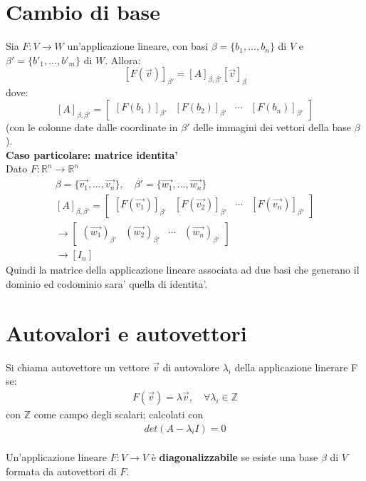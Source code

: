 \documentclass[10pt]{extarticle}
\begin{document}
\section{Cambio di base}
Sia \( F: V \to W \) un'applicazione lineare, con basi \( \beta = \{b_1, \dots, b_n\} \) di \( V \) e \( \beta' = \{b'_1, \dots, b'_m\} \) di \( W \). Allora:
\[
[F(\vec{v})]_{\beta'} = [A]_{\beta, \beta'} [\vec{v}]_{\beta}
\]
dove:
\[
[A]_{\beta, \beta'} = 
\begin{bmatrix}
[F(b_1)]_{\beta'} & [F(b_2)]_{\beta'} & \cdots & [F(b_n)]_{\beta'}
\end{bmatrix}
\]
(con le colonne date dalle coordinate in \( \beta' \) delle immagini dei vettori della base \( \beta \)).
\vspace{1em}\\
\textbf{Caso particolare: matrice identita'}\\
Dato $F : \mathbb{R}^n \to \mathbb{R}^n$
\begin{align*}
    \beta=\{\vec{v_1},\dots,\vec{v_n}\}, \quad \beta'=\{\vec{w_1},\dots,\vec{w_n}\} \\
[A]_{\beta, \beta'} = 
\begin{bmatrix}
[F(\vec{v_1})]_{\beta'} & [F(\vec{v_2})]_{\beta'} & \cdots & [F(\vec{v_n})]_{\beta'}
\end{bmatrix} \\
\to \begin{bmatrix}
(\vec{w_1})_{\beta'} & (\vec{w_2})_{\beta'} & \cdots & (\vec{w_n})_{\beta'}
\end{bmatrix} \\
\to [I_n]
\end{align*}
Quindi la matrice della applicazione lineare associata ad due basi che generano il dominio ed codominio sara' quella di identita'.

\section{Autovalori e autovettori}
Si chiama autovettore un vettore $\vec{v}$ di autovalore $\lambda_i$ della applicazione linerare F se:
\begin{align*}
    F(\vec{v})=\lambda\vec{v}, \quad \forall \lambda_i \in \mathbb{Z}
\end{align*}
con $\mathbb{Z}$ come campo degli scalari; calcolati con
\begin{align*}
    det(A-\lambda_iI)=0
\end{align*}
\vspace{1em}\\
Un'applicazione lineare \( F: V \to V \) è \textbf{diagonalizzabile} se esiste una base \( \beta \) di \( V \) formata da autovettori di \( F \).
\end{document}
